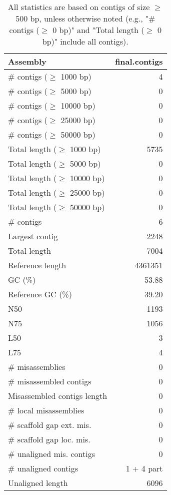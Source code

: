 \documentclass[12pt,a4paper]{article}
\begin{document}
\begin{table}[ht]
\begin{center}
\caption{All statistics are based on contigs of size $\geq$ 500 bp, unless otherwise noted (e.g., "\# contigs ($\geq$ 0 bp)" and "Total length ($\geq$ 0 bp)" include all contigs).}
\begin{tabular}{|l*{1}{|r}|}
\hline
Assembly & final.contigs \\ \hline
\# contigs ($\geq$ 1000 bp) & 4 \\ \hline
\# contigs ($\geq$ 5000 bp) & 0 \\ \hline
\# contigs ($\geq$ 10000 bp) & 0 \\ \hline
\# contigs ($\geq$ 25000 bp) & 0 \\ \hline
\# contigs ($\geq$ 50000 bp) & 0 \\ \hline
Total length ($\geq$ 1000 bp) & 5735 \\ \hline
Total length ($\geq$ 5000 bp) & 0 \\ \hline
Total length ($\geq$ 10000 bp) & 0 \\ \hline
Total length ($\geq$ 25000 bp) & 0 \\ \hline
Total length ($\geq$ 50000 bp) & 0 \\ \hline
\# contigs & 6 \\ \hline
Largest contig & 2248 \\ \hline
Total length & 7004 \\ \hline
Reference length & 4361351 \\ \hline
GC (\%) & 53.88 \\ \hline
Reference GC (\%) & 39.20 \\ \hline
N50 & 1193 \\ \hline
N75 & 1056 \\ \hline
L50 & 3 \\ \hline
L75 & 4 \\ \hline
\# misassemblies & 0 \\ \hline
\# misassembled contigs & 0 \\ \hline
Misassembled contigs length & 0 \\ \hline
\# local misassemblies & 0 \\ \hline
\# scaffold gap ext. mis. & 0 \\ \hline
\# scaffold gap loc. mis. & 0 \\ \hline
\# unaligned mis. contigs & 0 \\ \hline
\# unaligned contigs & 1 + 4 part \\ \hline
Unaligned length & 6096 \\ \hline

\end{tabular}
\end{center}
\end{table}
\end{document}
